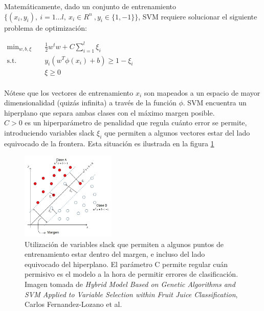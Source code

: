 Matemáticamente, dado un conjunto de entrenamiento $\{ (x_i,y_i), \ i=1 \ldots l, \ x_i \in R^n \ , y_i \in \{1,-1\} \}$, SVM requiere solucionar el siguiente problema de optimización:

\begin{center}
$\begin{aligned}
\min_{w,b,\xi} \quad & \frac{1}{2}w^{t}w+C\sum_{i=1}^{l}{\xi_{i}}\\
\textrm{s.t.} \quad & y_{i}(w^T\phi(x_{i})+b) \geq 1 - \xi_{i}\\
  &\xi\geq0    \\
\end{aligned}
$
\end{center}

Nótese que los vectores de entrenamiento $x_i$ son mapeados a un espacio de mayor dimensionalidad (quizás infinita) a través de la función $\phi$. SVM encuentra un hiperplano que separa ambas clases con el máximo margen posible. \\

$C>0$ es un hiperparámetro de penalidad que regula cuánto error se permite, introduciendo  variables slack $\xi_i$ que permiten a algunos vectores estar del lado equivocado de la frontera. Esta situación es ilustrada en la figura \ref{fig:svm_5}\\


\begin{figure}[h!]
\begin{center}
  \includegraphics[width=0.4\textwidth]{Kap1/slack.jpg} 
  \end{center}
 \caption{ Utilización de variables slack que permiten a algunos puntos de entrenamiento estar dentro del margen, e incluso del lado equivocado del hiperplano. El parámetro C permite regular cuán permisivo es el modelo a la hora de permitir errores de clasificación. Imagen tomada de \textit{Hybrid Model Based on Genetic Algorithms and SVM Applied to Variable Selection within Fruit Juice Classification}, Carlos Fernandez-Lozano et al. }
\label{fig:svm_5}
\end{figure}


